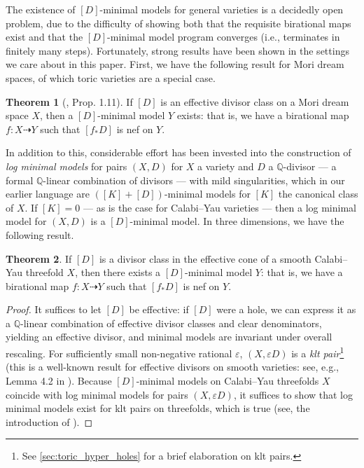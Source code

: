 \documentclass[11pt,dvipsnames]{article}
\theoremstyle{definition}
\newtheorem{theorem}{Theorem}
\renewcommand{\epsilon}{\varepsilon}
\begin{document}
The existence of $[D]$-minimal models for general varieties is a decidedly open problem, due to the difficulty of showing both that the requisite birational maps exist and that the $[D]$-minimal model program converges (i.e., terminates in finitely many steps). Fortunately, strong results have been shown in the settings we care about in this paper. First, we have the following result for Mori dream spaces, of which toric varieties are a special case.
\begin{theorem}[\cite{hu2000mori}, Prop. 1.11]
    If $[D]$ is an effective divisor class on a Mori dream space $X$, then a $[D]$-minimal model $Y$ exists: that is, we have a birational map $f : X \dashrightarrow Y$ such that $[f_* D]$ is nef on $Y$.
\end{theorem}
In addition to this, considerable effort has been invested into the construction of \textit{log minimal models} for pairs $(X,D)$ for $X$ a variety and $D$ a $\mathbb{Q}$-divisor ---  a formal $\mathbb{Q}$-linear combination of divisors --- with mild singularities, which in our earlier language are $([K] + [D])$-minimal models for $[K]$ the canonical class of $X$. If $[K] = 0$ --- as is the case for Calabi--Yau varieties --- then a log minimal model for $(X,D)$ is a $[D]$-minimal model. In three dimensions, we have the following result.
\begin{theorem}
    \label{th:cy_log_minimal_model}
    If $[D]$ is a divisor class in the effective cone of a smooth Calabi--Yau threefold $X$, then there exists a $[D]$-minimal model $Y$: that is, we have a birational map $f : X \dashrightarrow Y$ such that $[f_* D]$ is nef on $Y$.
\end{theorem}
\begin{proof}
    It suffices to let $[D]$ be effective: if $[D]$ were a hole, we can express it as a $\mathbb{Q}$-linear combination of effective divisor classes and clear denominators, yielding an effective divisor, and minimal models are invariant under overall rescaling. For sufficiently small non-negative rational $\epsilon$, $(X, \epsilon D)$ is a \textit{klt pair}\footnote{See \cref{sec:toric_hyper_holes} for a brief elaboration on klt pairs.} (this is a well-known result for effective divisors on smooth varieties: see, e.g., Lemma 4.2 in \cite{mckernan2010mori}). Because $[D]$-minimal models on Calabi--Yau threefolds $X$ coincide with log minimal models for pairs $(X, \epsilon D)$, it suffices to show that log minimal models exist for klt pairs on threefolds, which is true (see, the introduction of \cite{birkar2010existence}). 
\end{proof}
\end{document}
